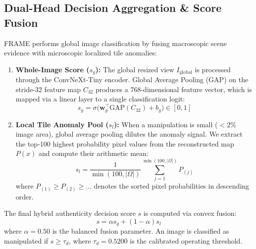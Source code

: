 \documentclass[sigconf,review=true]{acmart}
\begin{document}
\subsection{Dual-Head Decision Aggregation & Score Fusion}
FRAME performs global image classification by fusing macroscopic scene evidence with microscopic localized tile anomalies:
\begin{enumerate}
    \item \textbf{Whole-Image Score ($s_g$):} The global resized view $I_{\mathrm{global}}$ is processed through the ConvNeXt-Tiny encoder. Global Average Pooling (GAP) on the stride-32 feature map $C_{32}$ produces a 768-dimensional feature vector, which is mapped via a linear layer to a single classification logit:
    \begin{equation}
        s_g = \sigma\Big(\mathbf{w}_g^\top \mathrm{GAP}(C_{32}) + b_g\Big) \in [0, 1]
    \end{equation}
    \item \textbf{Local Tile Anomaly Pool ($s_l$):} When a manipulation is small ($<2\%$ image area), global average pooling dilutes the anomaly signal. We extract the top-100 highest probability pixel values from the reconstructed map $P(x)$ and compute their arithmetic mean:
    \begin{equation}
        s_l = \frac{1}{\min(100, |\Omega|)} \sum_{j=1}^{\min(100, |\Omega|)} P_{(j)}
        \label{eq:topk_pool}
    \end{equation}
    where $P_{(1)} \geq P_{(2)} \geq \dots$ denotes the sorted pixel probabilities in descending order.
\end{enumerate}
The final hybrid authenticity decision score $s$ is computed via convex fusion:
\begin{equation}
    s = \alpha s_g + (1 - \alpha) s_l
    \label{eq:hybrid_score}
\end{equation}
where $\alpha = 0.50$ is the balanced fusion parameter. An image is classified as manipulated if $s \geq \tau_d$, where $\tau_d = 0.5200$ is the calibrated operating threshold.
\end{document}
